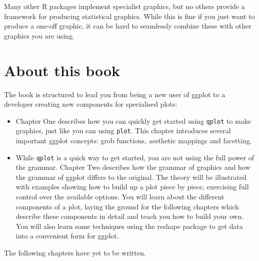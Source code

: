 Many other R packages implement specialist graphics, but no others provide a framework for producing statistical graphics. While this is fine if you just want to produce a one-off graphic, it can be hard to seamlessly combine these with other graphics you are using.

\section{About this book}\label{sec:about_this_book}


The book is structured to lead you from being a new user of ggplot to a developer creating new components for specialised plots:

\begin{itemize}
	\item Chapter One describes how you can quickly get started using {\tt qplot} to make graphics, just like you can using {\tt plot}.  This chapter introduces several important ggplot concepts: grob functions, aesthetic mappings and facetting.
	
	\item While {\tt qplot} is a quick way to get started, you are not using the full power of the grammar.  Chapter Two describes how the grammar of graphics and how the grammar of ggplot differs to the original.  The theory will be illustrated with examples showing how to build up a plot piece by piece, exercising full control over the available options.  You will learn about the different components of a plot, laying the ground for the following chapters which describe these components in detail and teach you how to build your own.  You will also learn some techniques using the reshape package to get data into a convenient form for ggplot.
\end{itemize}

The following chapters have yet to be written.

